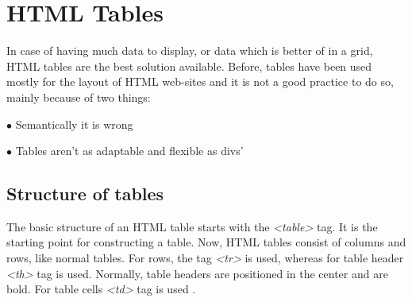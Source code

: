 %
%
% 
% 
% 


\chapter{HTML Tables}

\label{HTML5 Tables}

In case of having much data to display, or data which is better of in a grid, HTML tables
are the best solution available. Before, tables have been used mostly for the layout of 
HTML web-sites and it is not a good practice to do so, mainly because of two things:
 

$\bullet$ Semantically it is wrong

$\bullet$ Tables aren't as adaptable and flexible as divs'

\section{Structure of tables}

The basic structure of an HTML table starts with the \textit{<table>} tag. It is the starting
point for constructing a table. Now, HTML tables consist of columns and rows, like normal
tables. For rows, the tag  \textit{<tr>} is used, whereas for table header \textit{<th>} tag
is used. Normally, table headers are positioned in the center and are bold. For table cells
\textit{<td>} tag is used \parencite{7}. 
\newpage

